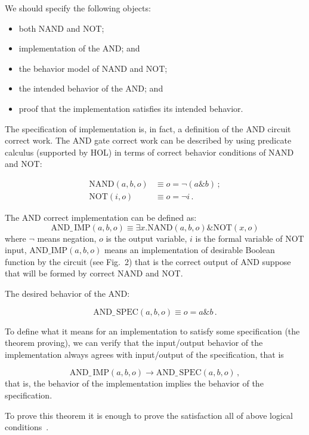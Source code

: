 \begin{multicols}{2}
\bigskip
\addtocounter{figure}{1}

We should specify the following objects:
\begin{itemize}
\item both NAND and NOT;
\item implementation of the AND; and
\item the behavior model of NAND and NOT;
\item the intended behavior of the AND; and
\item proof that the implementation satisfies its intended behavior.
\end{itemize}



The specification of implementation is, in fact, a defi\-nition of the AND circuit correct work. The AND gate
correct work can be described by using predicate calculus (supported by HOL) in terms of correct behavior
conditions of NAND and NOT:

\noindent
\begin{align*}
 \mathrm{NAND}(a,b,o) &\equiv o = \neg(a\&b)\,;\\
 \mathrm{NOT}(i,o) &\equiv o= \neg i\,.
\end{align*}

The AND correct implementation can be defined as:
$$
    \mathrm{AND}\_\,\mathrm{IMP}(a,b,o) \equiv \exists x. \mathrm{NAND}(a,b,o)\&\mathrm{NOT}(x,o)
$$
where $\neg$ means negation, $o$ is the output variable, $i$ is the formal variable of NOT input,
$\mathrm{AND}\_\mathrm{IMP}(a,b,o)$ means an implementation of  desirable Boolean function by the
circuit (see Fig.~2) that is the correct output of AND suppose that  will be formed by correct NAND and
NOT.

The desired behavior of the AND:

\noindent
        $$
            \mathrm{AND}\_\,\mathrm{SPEC}(a,b,o)\equiv o =a\&b\,.
$$

To define what it means for an implementation to satisfy some specification (the theorem proving), we can verify
that the input/output behavior of the imple\-men\-tation always agrees with input/output of the specification, that is

\noindent
$$
\mathrm{AND}\_\,\mathrm{IMP}(a,b,o)  \rightarrow \mathrm{AND}\_\,\mathrm{SPEC}(a,b,o)\,,
$$
that is, the behavior of the implementation implies the behavior of the specification.

   To prove this theorem it is enough to prove the satisfaction all of above logical conditions~\cite{13bar}.


\end{multicols}
